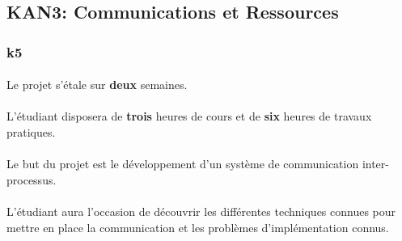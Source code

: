 \documentclass[10pt,a4wide]{article}
\begin{document}
\newpage

\subsection{KAN3: Communications et Ressources}

\paragraph{}

\subsubsection{k5}

\paragraph{}

Le projet s'\'etale sur \textbf{deux} semaines.

\paragraph{}

L'\'etudiant disposera de \textbf{trois} heures de cours et de \textbf{six}
heures de travaux pratiques.

\paragraph{}

Le but du projet est le d\'eveloppement d'un syst\`eme de communication
inter-processus.

\paragraph{}

L'\'etudiant aura l'occasion de d\'ecouvrir les diff\'erentes techniques
connues pour mettre en place la communication et les probl\`emes
d'impl\'ementation connus.

\vspace{5cm}
\end{document}
